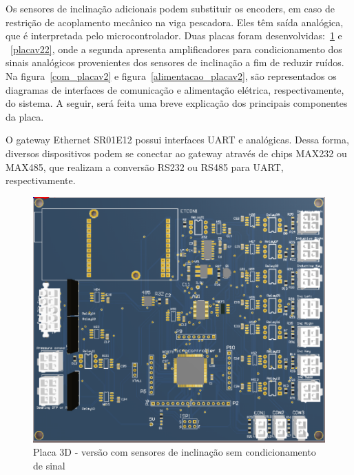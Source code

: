 Os sensores de inclinação adicionais podem substituir os encoders, em caso de
restrição de acoplamento mecânico na viga pescadora. Eles têm saída
analógica, que é interpretada pelo microcontrolador. Duas placas foram
desenvolvidas:~\ref{placav21} e ~\ref{placav22}, onde a segunda apresenta
amplificadores para condicionamento dos sinais analógicos provenientes dos
sensores de inclinação a fim de reduzir ruídos. Na
figura~\ref{com_placav2} e figura~\ref{alimentacao_placav2}, são
representados os diagramas de interfaces de comunicação e alimentação elétrica,
respectivamente, do sistema. A seguir, será feita uma breve explicação dos principais componentes da placa.

O gateway Ethernet SR01E12 possui interfaces UART e analógicas. Des\-sa forma,
diversos dispositivos podem se conectar ao gateway atra\-vés de chips MAX232 ou
MAX485, que realizam a conversão RS232 ou RS485 para UART, respectivamente.

\begin{figure}[H]
\centering
\includegraphics[width=1\columnwidth]{figs/eletronica/placav21.png}
\caption{Placa 3D - versão com sensores de inclinação sem condicionamento de
sinal}
\label{placav21}
\end{figure}

